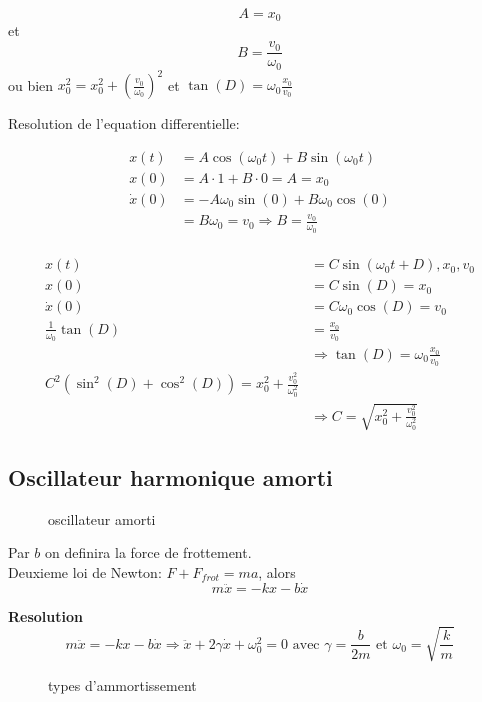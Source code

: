 \documentclass[../main.tex]{subfiles}
\begin{document}
\[ 
A=x_0
\]
et 
\[ 
B= \frac{v_0}{\omega_0}
\]
ou bien
$ x_0^{2}=x_0^{2}+ (\frac{v_0}{\omega_0})^{2}$ et $\tan(D)= \omega_0\frac{x_0}{v_0}$

Resolution de l'equation differentielle:

\begin{align*}
	x(t) &= A\cos(\omega_0 t) + B \sin(\omega_0t)\\
x(0) &= A \cdot 1 + B \cdot 0 = A = x_0\\
\dot{x}(0) &= -A \omega_0 \sin(0) + B \omega_0 \cos(0)\\
	   &= B \omega_0 = v_0 \Rightarrow B = \frac{v_0}{\omega_0}
\end{align*}
\hr\\
\begin{align*}
	x(t) &= C \sin(\omega_0t+ D), x_0,v_0\\
	x(0)&= C \sin(D) = x_0\\
	\dot{x}(0) &= C\omega_0\cos(D)=v_0\\
	\frac{1}{\omega_0} \tan(D) &= \frac{x_0}{v_0}\\
				   &\Rightarrow \tan(D) = \omega_0 \frac{x_0}{v_0}\\
				   C^{2}(\sin^{2}(D) + \cos^{2}(D)) = x_0^{2} + \frac{v_0^{2}}{\omega_0^{2}}\\
				   &\Rightarrow C= \sqrt{x_0^{2} + \frac{v_0^{2}}{\omega_0^{2}}}
\end{align*}
\subsection{Oscillateur harmonique amorti}
\begin{figure}[H]
    \centering
    \caption{oscillateur amorti}
    \label{fig:oscillateur-amorti}
\end{figure}
Par $b$ on definira la force de frottement.\\
Deuxieme loi de Newton: $F+F_{frot}=ma$, alors
\[ 
	m\ddot{x} = -kx - b\dot{x}
\]

\textbf{Resolution}\\

\[ 
	m\ddot{x} = -kx - b\dot{x} \Rightarrow \ddot{x} + 2\gamma \dot{x} + \omega_0^{2}=0 \text{ avec } \gamma=\frac{b}{2m} \text{ et } \omega_0=\sqrt{\frac{k}{m}}
\]
\begin{figure}[H]
    \centering
    \caption{types d'ammortissement}
    \label{fig:types-d'ammortissement}
\end{figure}
\end{document}
